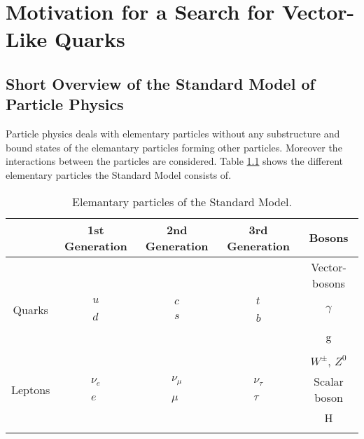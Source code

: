 \chapter{Motivation for a Search for Vector-Like Quarks}




\section{Short Overview of the Standard Model of Particle Physics}
Particle physics deals with elementary particles without any substructure and bound states of the elemantary particles forming other particles.
Moreover the interactions between the particles  are considered.
Table \ref{standardmodel} shows the different elementary particles the Standard Model consists of.

\begin{table}
\centering
\begin{tabular}{|c|c c c|c|} 
\hline
 & 1st Generation & 2nd Generation & 3rd Generation &  Bosons \\
\hline
\hline
&	&	&	& \small{Vector-bosons}	\\
Quarks &  $\begin{matrix} u \\ \\ d \end{matrix}$ & $\begin{matrix} c \\ \\ s \end{matrix}$ & $\begin{matrix} t \\ \\ b \end{matrix}$ & $\gamma$ \\
& & & & g  \\
&	&	&	&	\\
& &  &  & $W^{\pm}$, $Z^{0}$ \\
Leptons & $\begin{matrix} \nu_{e} \\ \\ e \end{matrix}$ & $\begin{matrix} \nu_{\mu} \\ \\ \mu \end{matrix}$ & $\begin{matrix} \nu_{\tau} \\ \\ \tau \end{matrix}$ & \small{Scalar boson}  \\
&	&	&	&   H \\
&	&	&	&     \\
 \hline
\end{tabular}
\caption{Elemantary particles of the Standard Model.}
\label{standardmodel}
\end{table}



